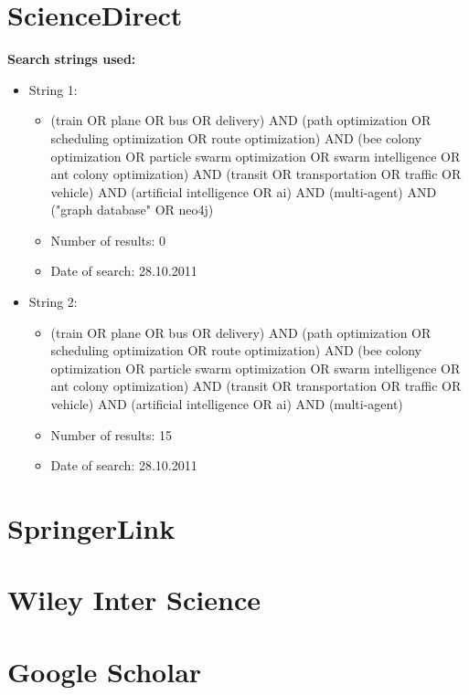 \section{ScienceDirect}
\textbf{Search strings used:}
\begin{itemize}
\item String 1:
\begin{itemize}
\item (train OR plane OR bus OR delivery) AND (path optimization OR scheduling optimization OR route optimization) AND (bee colony optimization OR particle swarm optimization OR swarm intelligence OR ant colony optimization) AND (transit OR transportation OR traffic OR vehicle) AND (artificial intelligence OR ai) AND (multi-agent) AND ("graph database" OR neo4j)
\item Number of results: 0
\item Date of search: 28.10.2011
\end{itemize}
\item String 2:
\begin{itemize}
\item (train OR plane OR bus OR delivery) AND (path optimization OR scheduling optimization OR route optimization) AND (bee colony optimization OR particle swarm optimization OR swarm intelligence OR ant colony optimization) AND (transit OR transportation OR traffic OR vehicle) AND (artificial intelligence OR ai) AND (multi-agent)
\item Number of results: 15
\item Date of search: 28.10.2011
\end{itemize}
\end{itemize}

\section{SpringerLink}

\section{Wiley Inter Science}

\section{Google Scholar}